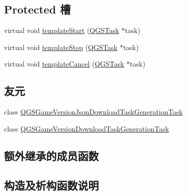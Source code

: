 \subsection*{Protected 槽}
\begin{DoxyCompactItemize}
\item 
virtual void \mbox{\hyperlink{class_q_g_s_game_version_builder_a6d8cd7b3da3d8c65040ae29d51f31d6c}{template\+Start}} (\mbox{\hyperlink{class_q_g_s_task}{Q\+G\+S\+Task}} $\ast$task)
\item 
virtual void \mbox{\hyperlink{class_q_g_s_game_version_builder_af93883aab24482e03c4e135693778f17}{template\+Stop}} (\mbox{\hyperlink{class_q_g_s_task}{Q\+G\+S\+Task}} $\ast$task)
\item 
virtual void \mbox{\hyperlink{class_q_g_s_game_version_builder_ad8f6dda86767042532f83d7c61336ffe}{template\+Cancel}} (\mbox{\hyperlink{class_q_g_s_task}{Q\+G\+S\+Task}} $\ast$task)
\end{DoxyCompactItemize}
\subsection*{友元}
\begin{DoxyCompactItemize}
\item 
class \mbox{\hyperlink{class_q_g_s_game_version_builder_a73b203af54b898ca2483d893c343141b}{Q\+G\+S\+Game\+Version\+Json\+Download\+Task\+Generation\+Task}}
\item 
class \mbox{\hyperlink{class_q_g_s_game_version_builder_ac1ad33ecea9de4412662c804c9225001}{Q\+G\+S\+Game\+Version\+Download\+Task\+Generation\+Task}}
\end{DoxyCompactItemize}
\subsection*{额外继承的成员函数}


\subsection{构造及析构函数说明}
\mbox{\label{class_q_g_s_game_version_builder_a516faecd748c35d59e5e049c06d72f5b}} 
